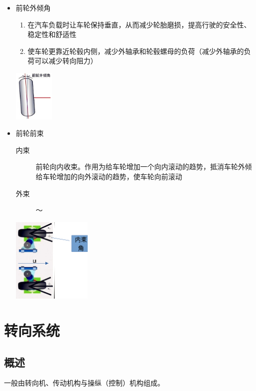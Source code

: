 \begin{itemize}
\begin{description}
\begin{center}
								\end{center}
						\end{description}
					\item 前轮外倾角
								\begin{enumerate}
									\item 在汽车负载时让车轮保持垂直，从而减少轮胎磨损，提高行驶的安全性、稳定性和舒适性
									\item 使车轮更靠近轮毂内侧，减少外轴承和轮毂螺母的负荷（减少外轴承的负荷可以减少转向阻力）
								\end{enumerate}
							\begin{center}
								\includegraphics[width=0.15\textwidth]{3-31}
							\end{center}
					\item 前轮前束
						\begin{description}
							\item[内束] 前轮向内收束。作用为给车轮增加一个向内滚动的趋势，抵消车轮外倾给车轮增加的向外滚动的趋势，使车轮向前滚动
							\item[外束] ～
						\end{description}
						\begin{center}
							\includegraphics[width=0.3\textwidth]{3-32}
						\end{center}
				\end{itemize}
\section{转向系统}
\subsection{概述}
	一般由转向机、传动机构与操纵（控制）机构组成。
	
